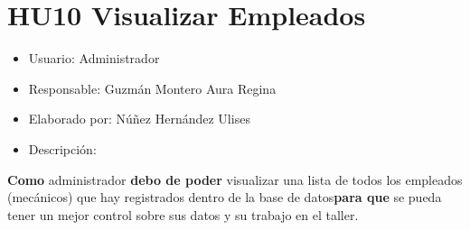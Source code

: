 \section{HU10 Visualizar Empleados}
\begin{itemize}
	\item Usuario: Administrador
	\item Responsable: Guzmán Montero Aura Regina
	\item Elaborado por: Núñez Hernández Ulises
	\item Descripción:\\
\end{itemize}

\textbf{Como} administrador \textbf{debo de poder} visualizar una lista de todos los empleados (mecánicos) que hay registrados dentro de la base de datos\textbf{para que} se pueda tener un mejor control sobre sus datos y su trabajo en el taller.